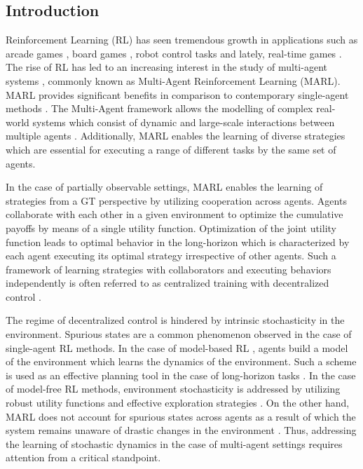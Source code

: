 \documentclass{article}
\begin{document}
\begin{multicols}{2}

\section{Introduction}
Reinforcement Learning (RL) has seen tremendous growth in applications such as arcade games \cite{atari}, board games \cite{go, shogi}, robot control tasks \cite{ddpg, ppo} and lately, real-time games \cite{SC2}. The rise of RL has led to an increasing interest in the study of multi-agent systems \cite{maddpg, alphastar}, commonly known as Multi-Agent Reinforcement Learning (MARL). MARL provides significant benefits in comparison to contemporary single-agent methods \cite{rl}. The Multi-Agent framework allows the modelling of complex real-world systems which consist of dynamic and large-scale interactions between multiple agents \cite{ltc}. Additionally, MARL enables the learning of diverse strategies which are essential for executing a range of different tasks by the same set of agents. 

In the case of partially observable settings, MARL enables the learning of strategies from a GT perspective by utilizing cooperation across agents\cite{cooperative}. Agents collaborate with each other in a given environment to optimize the cumulative payoffs by means of a single utility function. Optimization of the joint utility function leads to optimal behavior \cite{gt,selective} in the long-horizon which is characterized by each agent executing its optimal strategy irrespective of other agents. Such a framework of learning strategies with collaborators and executing behaviors independently is often referred to as centralized training with decentralized control \cite{coma}.

The regime of decentralized control is hindered by intrinsic stochasticity in the environment. Spurious states are a common phenomenon observed in the case of single-agent RL methods. In the case of model-based RL \cite{mbrl}, agents build a model of the environment which learns the dynamics of the environment. Such a scheme is used as an effective planning tool in the case of long-horizon tasks \cite{smirl}. In the case of model-free RL methods, environment stochasticity is addressed by utilizing robust utility functions \cite{surprise,surpmodeling} and effective exploration strategies \cite{gen}. On the other hand, MARL does not account for spurious states across agents as a result of which the system remains unaware of drastic changes in the environment \cite{role}. Thus, addressing the learning of stochastic dynamics in the case of multi-agent settings requires attention from a critical standpoint.


\end{multicols}
\end{document}
